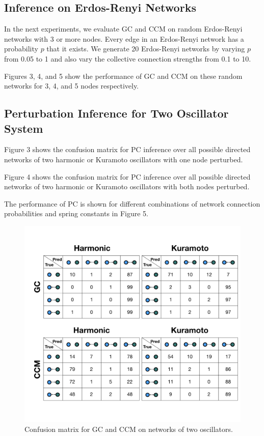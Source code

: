 \documentclass[]{article}
\begin{document}
\subsection{Inference on Erdos-Renyi Networks}
In the next experiments, we evaluate GC and CCM on random Erdos-Renyi networks with 3 or more nodes. Every edge in an Erdos-Renyi network has a probability $p$ that it exists. We generate 20 Erdos-Renyi networks by varying $p$ from 0.05 to 1 and also vary the collective connection strengths from 0.1 to 10.

Figures 3, 4, and 5 show the performance of GC and CCM on these random networks for 3, 4, and 5 nodes respectively.


\subsection{Perturbation Inference for Two Oscillator System}
Figure 3 shows the confusion matrix for PC inference over all possible directed networks of two harmonic or Kuramoto oscillators with one node perturbed.

Figure 4 shows the confusion matrix for PC inference over all possible directed networks of two harmonic or Kuramoto oscillators with both nodes perturbed.

The performance of PC is shown for different combinations of network connection probabilities and spring constants in Figure 5.

\begin{figure}
    \centering
    \includegraphics[width=12cm]{TwoNodeConfusionMatrix.jpeg}
    \caption{Confusion matrix for GC and CCM on networks of two oscillators.}
    \label{fig:example}
\end{figure}
\end{document}
